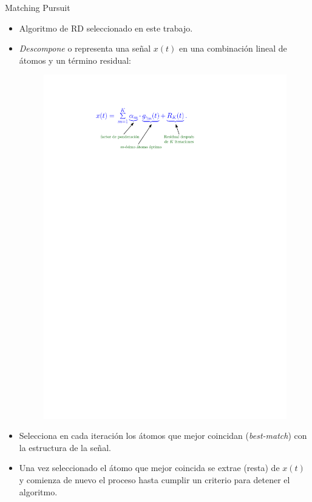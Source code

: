 \documentclass[xcolor=table]{beamer}
\begin{document}
\begin{frame}{Matching Pursuit}
	\begin{itemize}
		\item<2-> Algoritmo de RD seleccionado en este trabajo. 
		\item<3-> \emph{Descompone} o representa una se\~nal $x(t)$ en una combinaci\'on lineal de \'atomos y un t\'ermino residual:
					\begin{figure}
						\includegraphics[scale=0.95]{MP_equation.pdf}
					\end{figure}
		\item<4-> Selecciona en cada iteraci\'on los \'atomos que mejor coincidan (\emph{best-match}) con la estructura de la se\~nal.
		\item<5-> Una vez seleccionado el \'atomo que mejor coincida se extrae (resta) de $x(t)$ y comienza de nuevo el proceso hasta cumplir un criterio para detener el algoritmo. 
		
	\end{itemize}
\end{frame}
\end{document}
